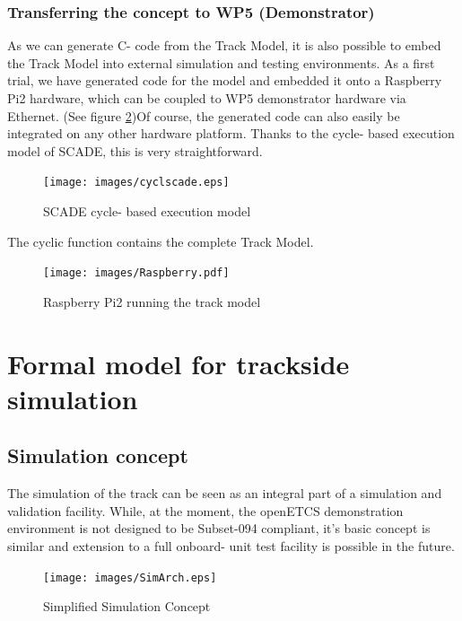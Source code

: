 \documentclass{template/openetcs_article}
\begin{document}
\subsubsection{Transferring the concept to WP5 (Demonstrator)}

As we can generate C- code from the Track Model, it is also possible to embed the Track Model into external simulation and testing environments.  As a first trial, we have generated code for the model and embedded it onto a Raspberry Pi2 hardware, which can be coupled to WP5 demonstrator hardware via Ethernet. (See figure \ref{fig:raspb})\newline Of course, the generated code can also easily be integrated on any other hardware platform. Thanks to the cycle- based execution model of SCADE, this is very straightforward.

\begin{figure}[H]
  \centering
  \texttt{[image: images/cyclscade.eps]}
  \caption{SCADE cycle- based execution model}
  \label{fig:SCcycle}
\end{figure}

The cyclic function contains the complete Track Model. 
\begin{figure}
  \centering
  \texttt{[image: images/Raspberry.pdf]}
  \caption{Raspberry Pi2 running the track model}
  \label{fig:raspb}
\end{figure}

\newpage

\section{Formal model for trackside simulation}
\subsection{Simulation concept}

The simulation of the track can be seen as an integral part of a simulation and validation facility. While, at the moment, the openETCS demonstration environment is not designed to be Subset-094 compliant, it's basic concept is similar and extension to a full onboard- unit test facility is possible in the future.\newline
\begin{figure}[H]
  \centering
  \texttt{[image: images/SimArch.eps]}
  \caption{Simplified Simulation Concept}
  \label{fig:simconcept}
\end{figure}
\end{document}
